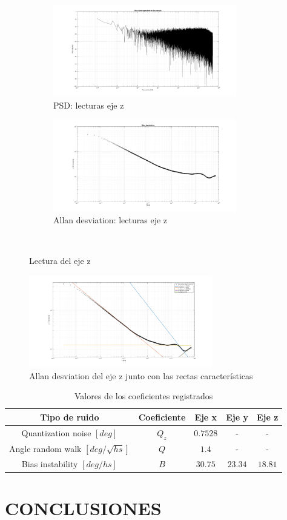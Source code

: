 \documentclass[a4paper,11pt,twoside]{IT-CNEA}
\begin{document}
\begin{figure}[t!]
    \centering
    \begin{subfigure}[t]{0.5\textwidth}
        \centering
        \includegraphics[width=8cm]{Figuras/PSDGyroz.png}
        \caption{PSD: lecturas eje z}
        \label{fig:}
    \end{subfigure}%
    \begin{subfigure}[t]{0.5\textwidth}
        \centering
        \includegraphics[width=8cm]{Figuras/AllanGyroz.png}
        \caption{Allan desviation: lecturas eje z}
        \label{fig:}
    \end{subfigure}%
    ~ 
    \caption{Lectura del eje z}
    \label{fig:lecturasEjez}
\end{figure}
\begin{figure}[h!]
\centering
\includegraphics[width=8cm]{Figuras/AllanGyrozRectas.png}
\caption{Allan desviation del eje z junto con las rectas características}
\label{fig:lecturaEjezRectas}
\end{figure}
\begin{table}[h!]
\centering
\caption{Valores de los coeficientes registrados}
\label{tabla:valoresCoeficientesEjes}
\begin{tabular}{|c|c|c|c|c|}
\hline
Tipo de ruido&Coeficiente& Eje x & Eje y & Eje z \\ \hline
Quantization noise $\left[ deg\right]$&$Q_z$&$0.7528$&-&- \\ \hline
Angle random walk $\left[ deg/\sqrt{hs}\right]$&$Q$&$1.4$&-&-\\ \hline
Bias instability $\left[ deg/hs \right]$&$B$&$30.75$ &$23.34$ &$18.81$\\ \hline
\end{tabular}
\end{table}
\clearpage
\newpage
\section{CONCLUSIONES}
\clearpage
\newpage


\end{document}
